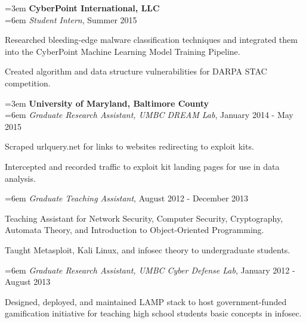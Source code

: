 \documentclass[a4paper, 11pt]{article}
\newcommand{\tab}{\hspace*{3em}}
\newcommand{\atab}{\hangindent=3em \hangafter=0}
\newcommand{\btab}{\hangindent=6em \hangafter=0}
\newenvironment{my_list}
{\begin{itemize}
    \vspace{-2mm}
    \setlength{\itemsep}{0pt}
    \setlength{\itemindent}{6em}
    \setlength{\parskip}{0pt}
    \setlength{\parsep}{0pt}}
{\end{itemize}}
\begin{document}
\medskip
\atab \textbf{CyberPoint International, LLC}\\
\btab \textit{Student Intern}, Summer 2015\\
\begin{my_list}
\item Researched bleeding-edge malware classification techniques and integrated them\\ \tab \tab into the CyberPoint Machine Learning Model Training Pipeline.
\item Created algorithm and data structure vulnerabilities for DARPA STAC competition.
\end{my_list}

\medskip
\atab \textbf{University of Maryland, Baltimore County}\\
\btab \textit{Graduate Research Assistant, UMBC DREAM Lab}, January 2014 - May 2015\\
\begin{my_list}
\item Scraped urlquery.net for links to websites redirecting to exploit kits.
\item Intercepted and recorded traffic to exploit kit landing pages for use in data analysis.
\end{my_list}

\btab \textit{Graduate Teaching Assistant}, August 2012 - December 2013\\
\begin{my_list}
\item Teaching Assistant for Network Security, Computer Security, Cryptography,\\ \tab \tab Automata Theory, and Introduction to Object-Oriented Programming.
\item Taught Metasploit, Kali Linux, and infosec theory to undergraduate students.
\end{my_list}

\btab \textit{Graduate Research Assistant, UMBC Cyber Defense Lab}, January 2012 - August 2013\\
\begin{my_list}
\item Designed, deployed, and maintained LAMP stack to host government-funded\\ \tab \tab gamification initiative for teaching high school students basic concepts in infosec.
\end{my_list}
\end{document}
